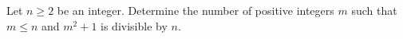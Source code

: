 Let $n\ge 2$ be an integer. Determine the number of positive integers $m$ such that $m\le n$ and $m^2+1$ is divisible by $n$.